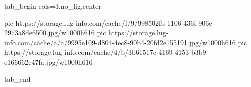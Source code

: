  
 
 
 
 


\ifcmt
  tab_begin cols=3,no_fig,center

     pic https://storage.lug-info.com/cache/f/9/998502fb-1106-436f-906e-2973a8de6500.jpg/w1000h616
		 pic https://storage.lug-info.com/cache/a/a/9995e109-d804-4ec8-90b4-20fd2e155191.jpg/w1000h616
		 pic https://storage.lug-info.com/cache/4/b/3b61517c-4169-4153-b3b9-e166662c47fa.jpg/w1000h616

  tab_end
\fi
